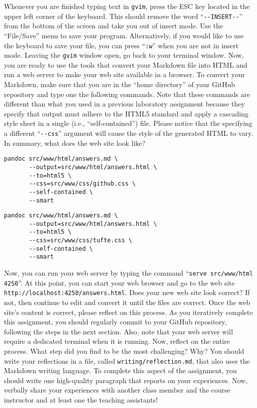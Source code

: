 \documentclass[11pt]{article}
\newcommand{\reflection}{\lstinline{writing/reflection.md}}
\newcommand{\command}[1]{``\lstinline{#1}''}
\newcommand{\program}[1]{\lstinline{#1}}
\newcommand{\url}[1]{\lstinline{#1}}
\newcommand{\option}[1]{``{#1}''}
\begin{document}
Whenever you are finished typing text in \program{gvim}, press the ESC key
located in the upper left corner of the keyboard. This should remove the word
\command{--INSERT--} from the bottom of the screen and take you out of insert
mode. Use the \option{File/Save} menu to save your program. Alternatively, if
you would like to use the keyboard to save your file, you can press \command{:w}
when you are not in insert mode. Leaving the {\tt gvim} window open, go back to
your terminal window. Now, you are ready to use the tools that convert your
Markdown file into HTML and run a web server to make your web site available in
a browser. To convert your Markdown, make sure that you are in the ``home
directory'' of your GitHub repository and type one the following commands. Note
that these commands are different than what you used in a previous laboratory
assignment because they specify that output must adhere to the HTML5 standard
and apply a cascading style sheet in a single (i.e., ``self-contained'') file.
Please notice that the specifying a different \command{--css} argument will
cause the style of the generated HTML to vary. In summary, what does the web
site look like?

\vspace*{-.05in}

\begin{verbatim}
pandoc src/www/html/answers.md \
       --output=src/www/html/answers.html \
       --to=html5 \
       --css=src/www/css/github.css \
       --self-contained \
       --smart
\end{verbatim}

\vspace*{-.2in}

\begin{verbatim}
pandoc src/www/html/answers.md \
       --output=src/www/html/answers.html \
       --to=html5 \
       --css=src/www/css/tufte.css \
       --self-contained \
       --smart
\end{verbatim}

\vspace*{-.05in}

Now, you can run your web server by typing the command \command{serve
src/www/html 4250}. At this point, you can start your web browser and go to the
web site \url{http://localhost:4250/answers.html}. Does your new web site look
correct? If not, then continue to edit and convert it until the files are
correct. Once the web site's content is correct, please reflect on this process.
As you iteratively complete this assignment, you should regularly commit to your
GitHub repository, following the steps in the next section. Also, note that your
web server will require a dedicated terminal when it is running. Now, reflect on
the entire process. What step did you find to be the most challenging? Why? You
should write your reflections in a file, called \reflection{}, that also uses
the Markdown writing language. To complete this aspect of the assignment, you
should write one high-quality paragraph that reports on your experiences. Now,
verbally share your experiences with another class member and the course
instructor and at least one the teaching assistants!
\end{document}
